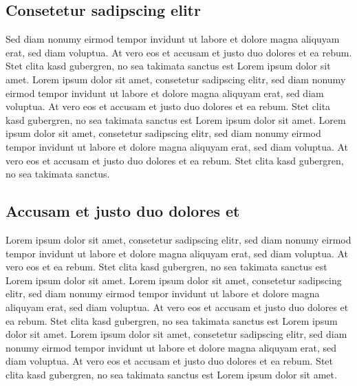 \documentclass[
    a4paper,             %
    12pt,                %
    headheight=34pt,     %
    parskip,             %
    bibliography=totoc,  %
    index=totoc,         %
    listof=totoc,        %
    ]{scrartcl}          %
\begin{document}
         \subsection{Consetetur sadipscing elitr}
             Sed diam nonumy eirmod tempor invidunt ut labore et dolore magna aliquyam erat, sed diam voluptua. At vero eos et accusam et justo duo dolores et ea rebum. Stet clita kasd gubergren, no sea takimata sanctus est Lorem ipsum dolor sit amet. Lorem ipsum dolor sit amet, consetetur sadipscing elitr, sed diam nonumy eirmod tempor invidunt ut labore et dolore magna aliquyam erat, sed diam voluptua. At vero eos et accusam et justo duo dolores et ea rebum. Stet clita kasd gubergren, no sea takimata sanctus est Lorem ipsum dolor sit amet. Lorem ipsum dolor sit amet, consetetur sadipscing elitr, sed diam nonumy eirmod tempor invidunt ut labore et dolore magna aliquyam erat, sed diam voluptua. At vero eos et accusam et justo duo dolores et ea rebum. Stet clita kasd gubergren, no sea takimata sanctus.   
        
         \subsection{Accusam et justo duo dolores et}
            Lorem ipsum dolor sit amet, consetetur sadipscing elitr, sed diam nonumy eirmod tempor invidunt ut labore et dolore magna aliquyam erat, sed diam voluptua. At vero eos et ea rebum. Stet clita kasd gubergren, no sea takimata sanctus est Lorem ipsum dolor sit amet. Lorem ipsum dolor sit amet, consetetur sadipscing elitr, sed diam nonumy eirmod tempor invidunt ut labore et dolore magna aliquyam erat, sed diam voluptua. At vero eos et accusam et justo duo dolores et ea rebum. Stet clita kasd gubergren, no sea takimata sanctus est Lorem ipsum dolor sit amet. Lorem ipsum dolor sit amet, consetetur sadipscing elitr, sed diam nonumy eirmod tempor invidunt ut labore et dolore magna aliquyam erat, sed diam voluptua. At vero eos et accusam et justo duo dolores et ea rebum. Stet clita kasd gubergren, no sea takimata sanctus est Lorem ipsum dolor sit amet.\citep[vgl.][Page 8]{woitowitz_digitaltechnik:_2012}   
    
\end{document}
